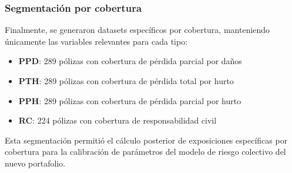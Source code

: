 \subsubsection{Segmentación por cobertura}

Finalmente, se generaron datasets específicos por cobertura, manteniendo únicamente las variables relevantes para cada tipo:

\begin{itemize}
    \item \textbf{PPD}: 289 pólizas con cobertura de pérdida parcial por daños
    \item \textbf{PTH}: 289 pólizas con cobertura de pérdida total por hurto  
    \item \textbf{PPH}: 289 pólizas con cobertura de pérdida parcial por hurto
    \item \textbf{RC}: 224 pólizas con cobertura de responsabilidad civil
\end{itemize}

Esta segmentación permitió el cálculo posterior de exposiciones específicas por cobertura para la calibración de parámetros del modelo de riesgo colectivo del nuevo portafolio.